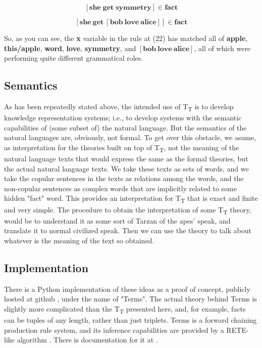 \documentclass{IOS-Book-Article}     %
\begin{document}
\begin{equation}
  \left[\mathbf{she\; get\; symmetry}\right]\in \mathbf{fact}
\end{equation}

\begin{equation}
  \left[\mathbf{she\: get\: \left[bob\: love\: alice\right]}\right]\in \mathbf{fact}
\end{equation}

So, as you can see, the \textbf{x} variable in the rule at (22) has matched
all  of \textbf{apple}, \textbf{this\-/apple}, \textbf{word}, \textbf{love},
\textbf{symmetry}, and $\left[\mathbf{bob}\: \mathbf{love}\: \mathbf{alice}\right]$,
all of which were performing quite different grammatical roles.

\subsection{Semantics}
As has been repeatedly stated above, the intended use of T\textsubscript{T}
is to develop knowledge representation systems; i.e., to develop systems with
the semantic capabilities of (some subset of) the natural language. But the
semantics of the natural languages are, obviously, not formal. To get over this
obstacle, we asume, as interpretation for the theories built on top of
T\textsubscript{T}, not the meaning of the natural language texts that would
express the same as the formal theories, but the actual natural language texts.
We take these texts as sets of words, and we take the copular sentences in the
texts as relations among the words, and the non-copular sentences as
complex words that are implicitly related to some hidden "fact" word. This
provides an interpretation for T\textsubscript{T} that is exact and finite and
very simple. The procedure to obtain the interpretation of some
T\textsubscript{T} theory, would be to understand it as some sort of Tarzan of
the apes' speak, and translate it to normal civilized speak. Then we can use
the theory to talk about whatever is the meaning of the text so obtained.

\subsection{Implementation}
There is a Python implementation of these ideas as a proof of concept,
publicly hosted at github \cite{r5}, under the name of "Terms". The actual
theory behind Terms is slightly more complicated than the T\textsubscript{T}
presented here, and, for example,
facts can be tuples of any length, rather than just triplets. Terms is a
forward chaining production rule system, and its inference
capabilities are provided by a RETE-like algorithm \cite{r6}. There is
documentation for it at \cite{r7}.
\end{document}
